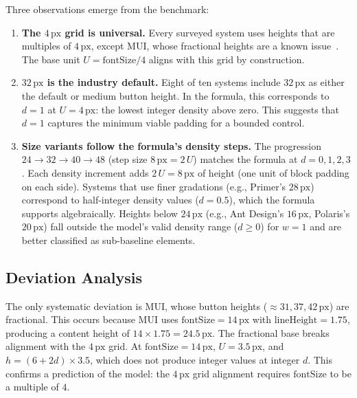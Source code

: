 Three observations emerge from the benchmark:

\begin{enumerate}
  \item \textbf{The $4\,\text{px}$ grid is universal.}
  Every surveyed system uses heights that are multiples of $4\,\text{px}$, except MUI, whose fractional heights are a known issue~\cite{mui}. The base unit $U = \text{fontSize} / 4$ aligns with this grid by construction.

  \item \textbf{$32\,\text{px}$ is the industry default.}
  Eight of ten systems include $32\,\text{px}$ as either the default or medium button height. In the formula, this corresponds to $d = 1$ at $U = 4\,\text{px}$: the lowest integer density above zero. This suggests that $d = 1$ captures the minimum viable padding for a bounded control.

  \item \textbf{Size variants follow the formula's density steps.}
  The progression $24 \to 32 \to 40 \to 48$ (step size $8\,\text{px} = 2\,U$) matches the formula at $d = 0, 1, 2, 3$. Each density increment adds $2\,U = 8\,\text{px}$ of height (one unit of block padding on each side). Systems that use finer gradations (e.g., Primer's $28\,\text{px}$) correspond to half-integer density values ($d = 0.5$), which the formula supports algebraically. Heights below $24\,\text{px}$ (e.g., Ant Design's $16\,\text{px}$, Polaris's $20\,\text{px}$) fall outside the model's valid density range ($d \ge 0$) for $w = 1$ and are better classified as sub-baseline elements.
\end{enumerate}

\subsection{Deviation Analysis}

The only systematic deviation is MUI, whose button heights ($\approx 31, 37, 42\,\text{px}$) are fractional. This occurs because MUI uses $\text{fontSize} = 14\,\text{px}$ with $\text{lineHeight} = 1.75$, producing a content height of $14 \times 1.75 = 24.5\,\text{px}$. The fractional base breaks alignment with the $4\,\text{px}$ grid. At $\text{fontSize} = 14\,\text{px}$, $U = 3.5\,\text{px}$, and $h = (6 + 2d) \times 3.5$, which does not produce integer values at integer $d$. This confirms a prediction of the model: the $4\,\text{px}$ grid alignment requires $\text{fontSize}$ to be a multiple of $4$.

